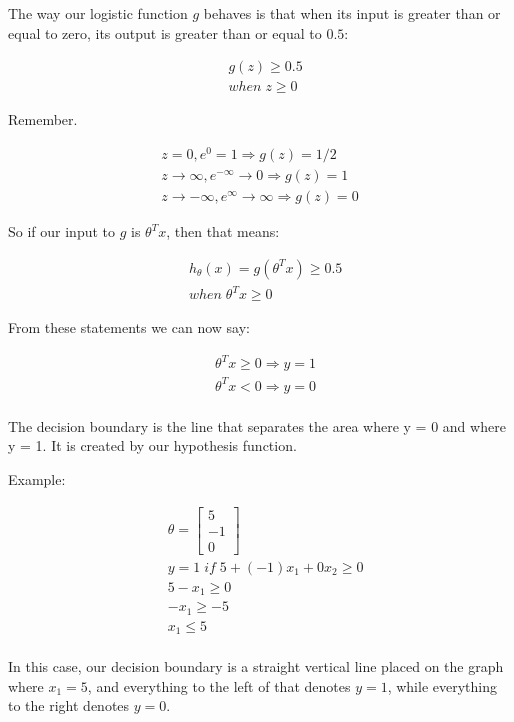 \documentclass[10pt,a4paper,UTF8]{article}
\begin{document}
The way our logistic function \(g\) behaves is that when its input is greater than or equal to zero, its output is greater than or equal to \(0.5\):

\begin{align*}& g(z) \geq 0.5 \\& when \; z \geq 0\end{align*}

Remember.

\begin{align*}z=0, e^{0}=1 \Rightarrow g(z)=1/2\\ z \to \infty, e^{-\infty} \to 0 \Rightarrow g(z)=1 \\ z \to -\infty, e^{\infty}\to \infty \Rightarrow g(z)=0 \end{align*}

So if our input to \(g\) is \(\theta^{T}x\), then that means:

\begin{align*}& h_\theta(x) = g(\theta^T x) \geq 0.5 \\& when \; \theta^T x \geq 0\end{align*}

From these statements we can now say:

\begin{align*}& \theta^T x \geq 0 \Rightarrow y = 1 \\& \theta^T x < 0 \Rightarrow y = 0 \\\end{align*}

The decision boundary is the line that separates the area where y = 0 and where y = 1. It is created by our hypothesis function.

Example:

\begin{align*}& \theta = \begin{bmatrix}5 \\ -1 \\ 0\end{bmatrix} \\ & y = 1 \; if \; 5 + (-1) x_1 + 0 x_2 \geq 0 \\ & 5 - x_1 \geq 0 \\ & - x_1 \geq -5 \\& x_1 \leq 5 \\ \end{align*}

In this case, our decision boundary is a straight vertical line placed on the graph where \(x_{1}=5\), and everything to the left of that denotes \(y=1\), while everything to the right denotes \(y=0\).
\end{document}
